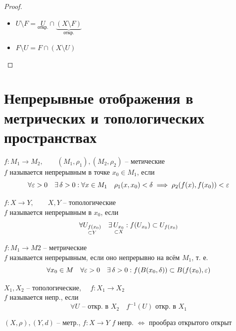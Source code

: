 \begin{proof}
	\hfill
	\begin{itemize}
		\item $ U \setminus F = \underset{\text{откр.}}U \cap \underbrace{(X \setminus F)}_{\text{откр.}} $
		\item $ F \setminus U = F \cap (X \setminus U) $
	\end{itemize}

\end{proof}

\section{Непрерывные отображения в метрических и топологических пространствах}

\begin{definition}
	$ f : M_1 \to M_2, \qquad (M_1, \rho_1), (M_2, \rho_2) $ -- метические \\
	$ f $ называется непрерывным в точке $ x_0 \in M_1 $, если
	$$ \forall \varepsilon > 0 \quad \exists\, \delta > 0 : \forall x \in M_1 \quad \rho_1(x, x_0) < \delta \implies \rho_2(f(x), f(x_0)) < \varepsilon $$
\end{definition}

\begin{definition}
	$ f : X \to Y, \qquad X, Y $ -- топологические \\
	$ f $ называется непрерывным в $ x_0 $, если
	$$ \forall \underset{\subset Y}{U_{f(x_0)}} \quad \exists\, \underset{\subset X}{U_{x_0}} : f(U_{x_0}) \subset U_{f(x_0)} $$
\end{definition}

\begin{definition}
	$ f : M_1 \to M2 $ -- метрические \\
	$ f $ называется непрерывным, если оно непрерывно на всём $ M_1 $, т. е.
	$$ \forall x_0 \in M \quad \forall \varepsilon > 0 \quad \exists\, \delta > 0 : f(B(x_0, \delta)) \subset B(f(x_0), \varepsilon) $$
\end{definition}

\begin{definition}
	$ X_1, X_2 $ -- топологические, $ \quad f : X_1 \to X_2 $ \\
	$ f $ называется непр., если
	$$ \forall U \text{ -- откр. в } X_2 \quad f^{-1}(U) \text{ откр. в } X_1 $$
\end{definition}

\begin{theorem}
	$ (X, \rho), (Y, d) $ -- метр., $ f : X \to Y $
	$ f $ непр. $ \iff $ прообраз открытого открыт
\end{theorem}

